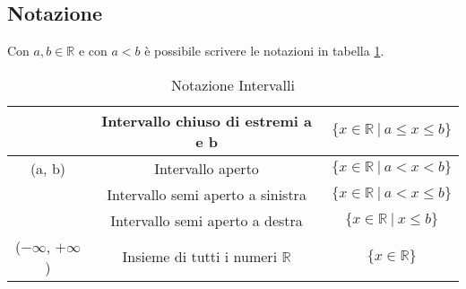 \subsection{Notazione}
Con $a, b \in \mathbb{R}$ e con $a < b$ è possibile scrivere le notazioni in tabella \ref{tab:notazione-intervalli}.
\begin{table}[h!]
    \centering
    \setlength{\tabcolsep}{7pt}
    \renewcommand{\arraystretch}{2}
    \begin{tabular}{|c|c|c|} \hline
        [a, b] & Intervallo chiuso di estremi a e b & $\{x \in \mathbb{R} \: | \: a \leq x \leq b\}$ \\ \hline
        (a, b) & Intervallo aperto & $\{x \in \mathbb{R} \: | \: a < x < b\}$ \\ \hline
        [a, b) & Intervallo semi aperto a destra & $\{x \in \mathbb{R} \: | \: a \leq x < b\}$ \\ \hline
        (a, b] & Intervallo semi aperto a sinistra & $\{x \in \mathbb{R} \: | \: a < x \leq b\}$ \\ \hline
        [a, $+\infty$) & Semiretta chiusa a sinistra & $\{x \in \mathbb{R} \: | \: a \leq x\}$ \\ \hline
        ($-\infty$, b] & Intervallo semi aperto a destra & $\{x \in \mathbb{R} \: | \: x \leq b\}$ \\ \hline
        ($-\infty$, $+\infty$) & Insieme di tutti i numeri $\mathbb{R}$ & $\{x \in \mathbb{R}\}$ \\ \hline
    \end{tabular}
    \caption{Notazione Intervalli}
    \label{tab:notazione-intervalli}
\end{table}